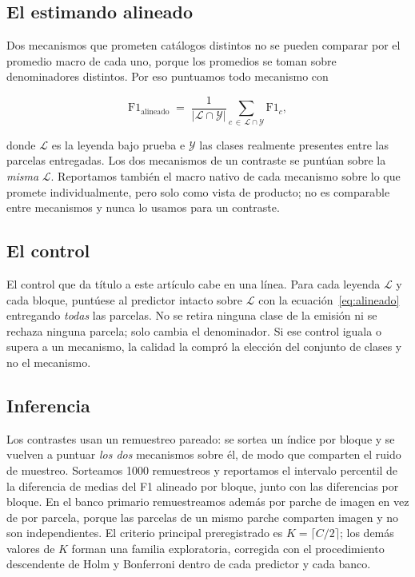 \subsection{El estimando alineado}
\label{sec:estimando}

Dos mecanismos que prometen catálogos distintos no se pueden comparar por el promedio macro de cada
uno, porque los promedios se toman sobre denominadores distintos. Por eso puntuamos todo mecanismo
con

\begin{equation}
  \mathrm{F1}_{\text{alineado}} \;=\; \frac{1}{|\mathcal{L} \cap \mathcal{Y}|}
  \sum_{c \,\in\, \mathcal{L} \cap \mathcal{Y}} \mathrm{F1}_c ,
  \label{eq:alineado}
\end{equation}

\noindent donde $\mathcal{L}$ es la leyenda bajo prueba e $\mathcal{Y}$ las clases realmente
presentes entre las parcelas entregadas. Los dos mecanismos de un contraste se puntúan sobre la
\emph{misma} $\mathcal{L}$. Reportamos también el macro nativo de cada mecanismo sobre lo que
promete individualmente, pero solo como vista de producto; no es comparable entre mecanismos y
nunca lo usamos para un contraste.

\subsection{El control}
\label{sec:control}

El control que da título a este artículo cabe en una línea. Para cada leyenda $\mathcal{L}$ y cada
bloque, puntúese al predictor intacto sobre $\mathcal{L}$ con la ecuación~\ref{eq:alineado}
entregando \emph{todas} las parcelas. No se retira ninguna clase de la emisión ni se rechaza
ninguna parcela; solo cambia el denominador. Si ese control iguala o supera a un mecanismo, la
calidad la compró la elección del conjunto de clases y no el mecanismo.

\subsection{Inferencia}
\label{sec:inferencia}

Los contrastes usan un remuestreo pareado: se sortea un índice por bloque y se vuelven a puntuar
\emph{los dos} mecanismos sobre él, de modo que comparten el ruido de muestreo. Sorteamos
\num{1000} remuestreos y reportamos el intervalo percentil de la diferencia de medias del F1
alineado por bloque, junto con las diferencias por bloque. En el banco primario remuestreamos
además por parche de imagen en vez de por parcela, porque las parcelas de un mismo parche comparten
imagen y no son independientes. El criterio principal preregistrado es $K = \lceil C/2 \rceil$; los
demás valores de $K$ forman una familia exploratoria, corregida con el procedimiento descendente de
Holm y Bonferroni dentro de cada predictor y cada banco.
